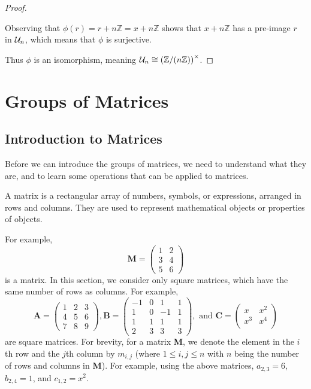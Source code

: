 \begin{proof}
\begin{itemize}
        Observing that $\phi(r) = r + n\mathbb{Z} = x + n\mathbb{Z}$ shows that $x + n\mathbb{Z}$ has a pre-image $r$ in $\mathcal{U}_{n}$, which means that $\phi$ is surjective.
    \end{itemize}

    Thus $\phi$ is an isomorphism, meaning $\mathcal{U}_{n} \cong \left(\mathbb{Z}/(n\mathbb{Z})\right)^{\times}$.
\end{proof}

\section{Groups of Matrices}
\subsection{Introduction to Matrices}
Before we can introduce the groups of matrices, we need to understand what they are, and to learn some operations that can be applied to matrices.

A matrix is a rectangular array of numbers, symbols, or expressions, arranged in rows and columns. They are used to represent mathematical objects or properties of objects.

For example,
\[
    \textbf{M} = \begin{pmatrix}
    1 & 2\\
    3 & 4\\
    5 & 6
    \end{pmatrix}
\]
is a matrix. In this section, we consider only square matrices, which have the same number of rows as columns. For example,
\[
    \textbf{A} = \begin{pmatrix}
    1 & 2 & 3\\
    4 & 5 & 6\\
    7 & 8 & 9
    \end{pmatrix}, \textbf{B} = \begin{pmatrix}
    -1 & 0 & 1 & 1\\
    1 & 0 & -1 & 1\\
    1 & 1 & 1 & 1\\
    2 & 3 & 3 & 3
    \end{pmatrix}, \textrm{ and } \textbf{C} = \begin{pmatrix}
    x & x^2\\
    x^3 & x^4\\
    \end{pmatrix}
\]
are square matrices. For brevity, for a matrix \textbf{M}, we denote the element in the $i$th row and the $j$th column by $m_{i,j}$ (where $1 \leq i, j \leq n$ with $n$ being the number of rows and columns in \textbf{M}). For example, using the above matrices, $a_{2,3} = 6$, $b_{2,4}=1$, and $c_{1,2} = x^2$.

